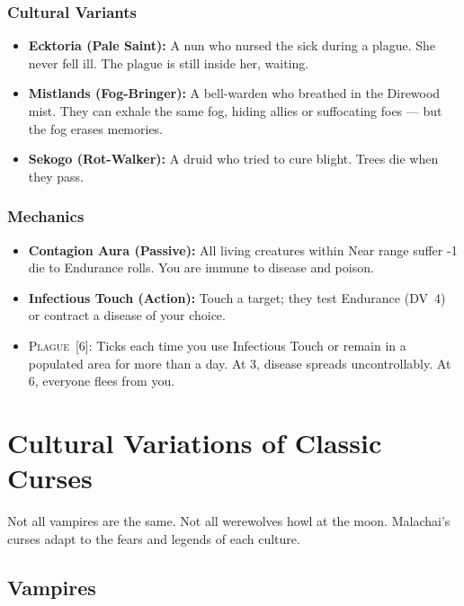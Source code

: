 \documentclass[10pt,twoside]{book}
\newcommand{\dv}[1]{\textsc{DV}~#1}
\newcommand{\timer}[2]{\textsc{#1}~[#2]}
\begin{document}
\subsection*{Cultural Variants}
\begin{itemize}
\item \textbf{Ecktoria (Pale Saint):} A nun who nursed the sick during a plague. She never fell ill. The plague is still inside her, waiting.
\item \textbf{Mistlands (Fog-Bringer):} A bell-warden who breathed in the Direwood mist. They can exhale the same fog, hiding allies or suffocating foes --- but the fog erases memories.
\item \textbf{Sekogo (Rot-Walker):} A druid who tried to cure blight. Trees die when they pass.
\end{itemize}

\subsection*{Mechanics}
\begin{itemize}
\item \textbf{Contagion Aura (Passive):} All living creatures within Near range suffer -1 die to Endurance rolls. You are immune to disease and poison.
\item \textbf{Infectious Touch (Action):} Touch a target; they test Endurance (\dv{4}) or contract a disease of your choice.
\item \timer{Plague}{6}: Ticks each time you use Infectious Touch or remain in a populated area for more than a day. At 3, disease spreads uncontrollably. At 6, everyone flees from you.
\end{itemize}

\chapter{Cultural Variations of Classic Curses}

Not all vampires are the same. Not all werewolves howl at the moon. Malachai's curses adapt to the fears and legends of each culture.

\section{Vampires}
\end{document}
